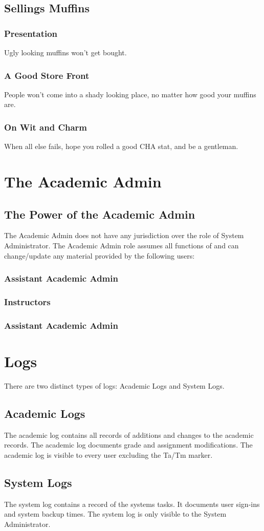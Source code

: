 \documentclass{article}
\begin{document}
\subsection{Sellings Muffins}
\subsubsection{Presentation}
Ugly looking muffins won't get bought.
\subsubsection{A Good Store Front}
People won't come into a shady looking place, no matter how good your muffins are.
\subsubsection{On Wit and Charm}
When all else fails, hope you rolled a good CHA stat, and be a gentleman.


\section{The Academic Admin}
\subsection{The Power of the Academic Admin}
The Academic Admin does not have any jurisdiction over the role of System Administrator.
The Academic Admin role assumes all functions of and can change/update any material provided by the following users: 
\subsubsection{Assistant Academic Admin}
\subsubsection{Instructors}
\subsubsection{Assistant Academic Admin}


\section{Logs}
There are two distinct types of logs: Academic Logs and System Logs.
\subsection{Academic Logs}
The academic log contains all records of additions and changes to the academic records.  The academic log documents grade and assignment modifications.  The academic log is visible to every user excluding the Ta/Tm marker.
\subsection{System Logs}
The system log contains a record of the systems tasks.  It documents user sign-ins and system backup times.  The system log is only visible to the System Administrator.
\end{document}
